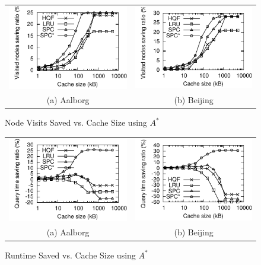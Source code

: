 \begin{figure}[htb]
\center
  \begin{tabular}{@{}c@{ }c@{}}
     \includegraphics[width=0.5\columnwidth]{figures/cachesize_diffnodes_aal_server_astar.pdf}
     &
     \includegraphics[width=0.5\columnwidth]{figures/cachesize_diffnodes_bei_server_astar.pdf}
      \\
     (a) Aalborg & (b)  Beijing
     \end{tabular}
\caption{Node Visits Saved vs. Cache Size using $A^*$}
\label{fig:cachesize_diffnodes_server_astar}
\end{figure}


\begin{figure}[htb]
\center
  \begin{tabular}{@{}c@{ }c@{}}
     \includegraphics[width=0.5\columnwidth]{figures/cachesize_diffruntime_aal_server_astar.pdf}
     &
     \includegraphics[width=0.5\columnwidth]{figures/cachesize_diffruntime_bei_server_astar.pdf}
      \\
     (a) Aalborg & (b)  Beijing
     \end{tabular}
\caption{Runtime Saved vs. Cache Size using $A^*$}
\label{fig:cachesize_diffruntime_server_astar}
\end{figure}






